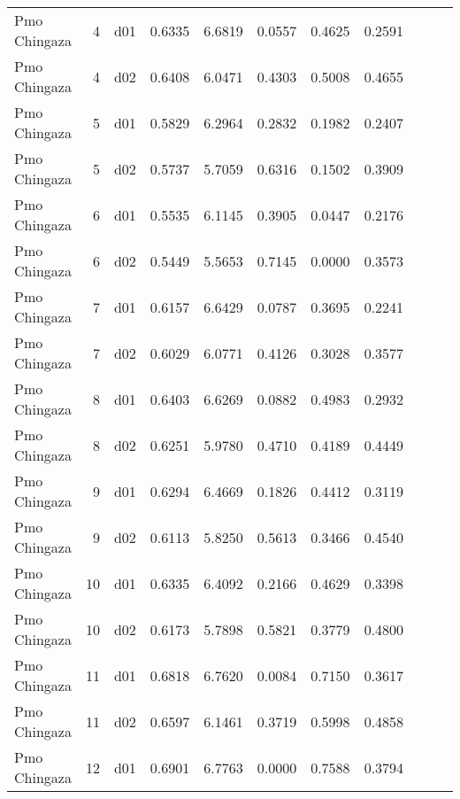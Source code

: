 \begin{landscape}
\begin{longtable}{p{2cm}rrrrrrrrrr}
            Pmo Chingaza  &          4 &     d01 &   0.6335 &  6.6819 &        0.0557 &           0.4625 &  0.2591 \\
            Pmo Chingaza  &          4 &     d02 &   0.6408 &  6.0471 &        0.4303 &           0.5008 &  0.4655 \\
            Pmo Chingaza  &          5 &     d01 &   0.5829 &  6.2964 &        0.2832 &           0.1982 &  0.2407 \\
            Pmo Chingaza  &          5 &     d02 &   0.5737 &  5.7059 &        0.6316 &           0.1502 &  0.3909 \\
            Pmo Chingaza  &          6 &     d01 &   0.5535 &  6.1145 &        0.3905 &           0.0447 &  0.2176 \\
            Pmo Chingaza  &          6 &     d02 &   0.5449 &  5.5653 &        0.7145 &           0.0000 &  0.3573 \\
            Pmo Chingaza  &          7 &     d01 &   0.6157 &  6.6429 &        0.0787 &           0.3695 &  0.2241 \\
            Pmo Chingaza  &          7 &     d02 &   0.6029 &  6.0771 &        0.4126 &           0.3028 &  0.3577 \\
            Pmo Chingaza  &          8 &     d01 &   0.6403 &  6.6269 &        0.0882 &           0.4983 &  0.2932 \\
            Pmo Chingaza  &          8 &     d02 &   0.6251 &  5.9780 &        0.4710 &           0.4189 &  0.4449 \\
            Pmo Chingaza  &          9 &     d01 &   0.6294 &  6.4669 &        0.1826 &           0.4412 &  0.3119 \\
            Pmo Chingaza  &          9 &     d02 &   0.6113 &  5.8250 &        0.5613 &           0.3466 &  0.4540 \\
            Pmo Chingaza  &         10 &     d01 &   0.6335 &  6.4092 &        0.2166 &           0.4629 &  0.3398 \\
            Pmo Chingaza  &         10 &     d02 &   0.6173 &  5.7898 &        0.5821 &           0.3779 &  0.4800 \\
            Pmo Chingaza  &         11 &     d01 &   0.6818 &  6.7620 &        0.0084 &           0.7150 &  0.3617 \\
            Pmo Chingaza  &         11 &     d02 &   0.6597 &  6.1461 &        0.3719 &           0.5998 &  0.4858 \\
            Pmo Chingaza  &         12 &     d01 &   0.6901 &  6.7763 &        0.0000 &           0.7588 &  0.3794 \\

\end{longtable}
\end{landscape}
